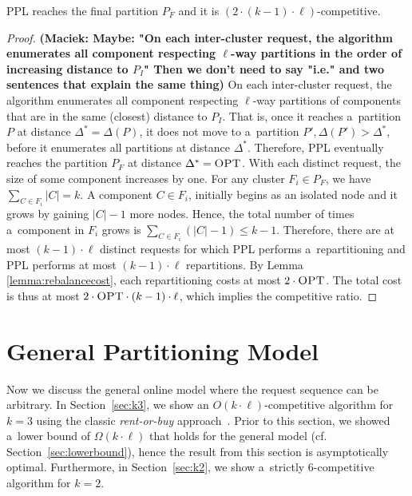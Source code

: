 \documentclass[a4paper,anonymous,USenglish]{lipics-v2019}
\newcommand{\OPT}{\textsc{OPT}\xspace}
\newcommand{\PPL}{\textsc{PPL}\xspace}
\newcommand{\OBRP}{BRP\xspace}
\newcommand\maciek[1]{\color{brown}\textbf{(Maciek: #1)}\color{black}}
\begin{document}
\begin{theorem}	\label{thm:upperbound}
	\PPL reaches the final partition $P_F$
	 and it is $(2\cdot (k-1)\cdot\ell)$-competitive.
\end{theorem}
\begin{proof}
	\maciek{Maybe: "On each inter-cluster request, the algorithm enumerates all component respecting $\ell$-way partitions in the order of increasing distance to $P_I$" Then we don't need to say "i.e." and two sentences that explain the same thing}
	On each inter-cluster request,
	the algorithm enumerates all component respecting $\ell$-way partitions of components
	that are in the same (closest) distance to $P_I$.
	That is, 
	once it reaches a~partition $P$ at distance $\Delta^* = \Delta(P)$,
	it does not move to a~partition
	$P', \Delta(P') > \Delta^*$,
	before it enumerates all partitions at distance $\Delta^*$.
	Therefore,
	\PPL eventually reaches  the partition $P_F$ at distance $\Delta^*=\OPT$.
	With each distinct request, 
	the size of some component increases by one.
	For any cluster $F_i \in P_F$,
	we have $\sum_{C \in F_i} |C| = k$.
	A component $C \in F_i$,
	 initially begins as an isolated node and it grows by gaining $|C|-1$ more nodes.
	Hence, the total number of times a~component in $F_i$ grows is 
	$\sum_{C \in F_i} (|C|-1) \leq k-1$.
	Therefore, there are at most  $(k-1)\cdot\ell $ distinct requests
	for which \PPL performs a~repartitioning and
	 \PPL performs at most $(k-1)\cdot\ell $ repartitions.
	By Lemma \ref{lemma:rebalancecost},
	each repartitioning costs at most $2\cdot\OPT$.
	The total cost is thus at most $2\cdot\OPT\cdot (k-1) \cdot\ell$, which implies the competitive ratio.
\end{proof}


\section{General Partitioning Model}
\label{sec:part}

Now  we discuss the general online
model where the request sequence
can be arbitrary.
In Section~\ref{sec:k3}, we show an $O(k \cdot \ell)$-competitive algorithm for $k=3$ using the classic \emph{rent-or-buy} approach~\cite{karlin-ski-rental}.
Prior to this section, we showed a~lower bound of $\Omega(k \cdot \ell)$  that holds for the general model (cf. Section~\ref{sec:lowerbound}), hence the result from this section is asymptotically optimal.
Furthermore, in Section~\ref{sec:k2}, we show a~strictly $6$-competitive algorithm for $k=2$.
\end{document}

